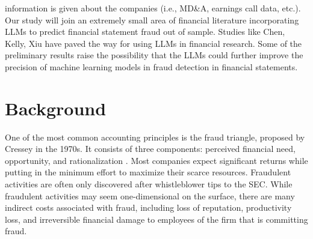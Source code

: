 \documentclass[conference]{IEEEtran}
\begin{document}
information is given about the companies (i.e., MD\&A, earnings call data, etc.). Our study will join an extremely small area of financial literature incorporating LLMs to predict financial statement fraud out of sample. Studies like Chen, Kelly, Xiu \cite{b2} have paved the way for using LLMs in financial research. Some of the preliminary results raise the possibility that the LLMs could further improve the precision of machine learning models in fraud detection in financial statements. 

\section{Background}

One of the most common accounting principles is the fraud triangle, proposed by Cressey in the 1970s. It consists of three components: perceived financial need, opportunity, and rationalization \cite{b8}. Most companies expect significant returns while putting in the minimum effort to maximize their scarce resources. Fraudulent activities are often only discovered after whistleblower tips to the SEC. While fraudulent activities may seem one-dimensional on the surface, there are many indirect costs associated with fraud, including loss of reputation, productivity loss, and irreversible financial damage to employees of the firm that is committing fraud. 
\end{document}
